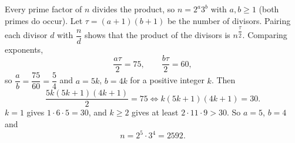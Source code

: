Every prime factor of $n$ divides the product, so $n=2^a3^b$ with $a,b\ge1$ (both primes do occur). Let $\tau=(a+1)(b+1)$ be the number of divisors. Pairing each divisor $d$ with $\dfrac nd$ shows that the product of the divisors is $n^{\dfrac{\tau}{2}}$. Comparing exponents,
\[\dfrac{a\tau}{2}=75,\qquad\dfrac{b\tau}{2}=60,\]
so $\dfrac ab=\dfrac{75}{60}=\dfrac54$ and $a=5k$, $b=4k$ for a positive integer $k$. Then
\[\dfrac{5k(5k+1)(4k+1)}{2}=75\iff k(5k+1)(4k+1)=30.\]
$k=1$ gives $1\cdot6\cdot5=30$, and $k\ge2$ gives at least $2\cdot11\cdot9>30$. So $a=5$, $b=4$ and
\[n=2^5\cdot3^4=\boxed{2592}.\]
